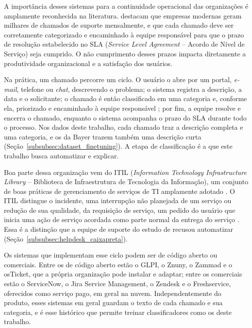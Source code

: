 \documentclass[
    12pt,                %
    openright,           %
    oneside,             %
    a4paper,             %
    english,             %
    brazil               %
]{abntex2}
\begin{document}
A importância desses sistemas para a continuidade operacional das organizações é amplamente reconhecida na literatura.  destacam que empresas modernas geram milhares de chamados de suporte mensalmente, e que cada chamado deve ser corretamente categorizado e encaminhado à equipe responsável para que o prazo de resolução estabelecido no SLA (\textit{Service Level Agreement} -- Acordo de Nível de Serviço) seja cumprido. O não cumprimento desses prazos impacta diretamente a produtividade organizacional e a satisfação dos usuários.

Na prática, um chamado percorre um ciclo. O usuário o abre por um portal, \textit{e-mail}, telefone ou \textit{chat}, descrevendo o problema; o sistema registra a descrição, a data e o solicitante; o chamado é então classificado em uma categoria e, conforme ela, priorizado e encaminhado à equipe responsável \cite{zemp2021}; por fim, a equipe resolve e encerra o chamado, enquanto o sistema acompanha o prazo do SLA durante todo o processo. Nos dados deste trabalho, cada chamado traz a descrição completa e uma categoria, e os da Bayer trazem também uma descrição curta (Seção~\ref{subsubsec:dataset_finetuning}). A etapa de classificação é a que este trabalho busca automatizar e explicar.

Boa parte dessa organização vem do ITIL (\textit{Information Technology Infrastructure Library} -- Biblioteca de Infraestrutura de Tecnologia da Informação), um conjunto de boas práticas de gerenciamento de serviços de TI amplamente adotado \cite{axelos2019}. O ITIL distingue o incidente, uma interrupção não planejada de um serviço ou redução de sua qualidade, da requisição de serviço, um pedido do usuário que inicia uma ação de serviço acordada como parte normal da entrega do serviço \cite{axelos2019}. Essa é a distinção que a equipe de suporte do estudo de  recusou automatizar (Seção~\ref{subsubsec:helpdesk_caixapreta}).

Os sistemas que implementam esse ciclo podem ser de código aberto ou comerciais. Entre os de código aberto estão o GLPI, o Znuny, o Zammad e o osTicket, que a própria organização pode instalar e adaptar; entre os comerciais estão o ServiceNow, o Jira Service Management, o Zendesk e o Freshservice, oferecidos como serviço pago, em geral na nuvem. Independentemente do produto, esses sistemas em geral guardam o texto de cada chamado e sua categoria, e é esse histórico que permite treinar classificadores como os deste trabalho.

\end{document}
